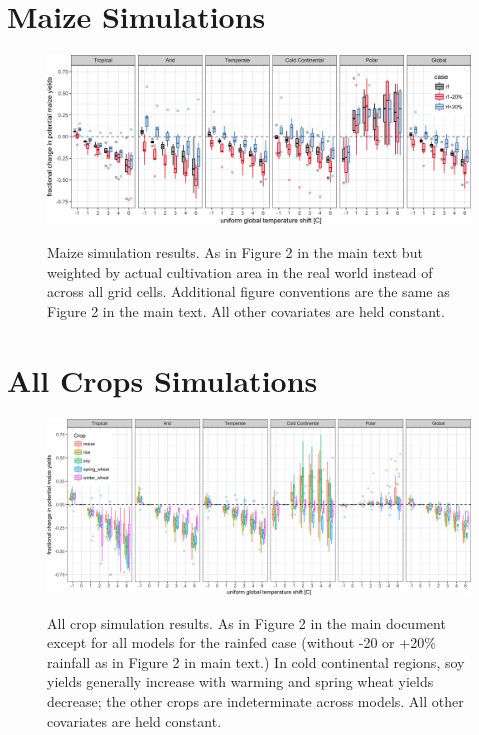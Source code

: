 \documentclass[10pt]{article}
\begin{document}
\clearpage
\section{Maize Simulations}
\begin{figure}[h!]
\includegraphics[width=\textwidth]{s_maize_sim_CG_area_weight_rf.png}\\
\caption{Maize simulation results. As in Figure 2 in the main text but weighted by actual cultivation area in the real world instead of across all grid cells. Additional figure conventions are the same as Figure 2 in the main text. All other covariates are held constant.}
\label{fig:KGirr_currentcult}
\end{figure}
\section{All Crops Simulations}
\begin{figure}[h!]
\includegraphics[width=\textwidth]{s_sim_KG_crops_all.png}\\
\caption{All crop simulation results. As in Figure 2 in the main document except for all models for the rainfed case (without -20 or +20\% rainfall as in Figure 2 in main text.) In cold continental regions, soy yields generally increase with warming and spring wheat yields decrease; the other crops are indeterminate across models. All other covariates are held constant.}
\label{fig:KGcrops_all}
\end{figure}
\end{document}
